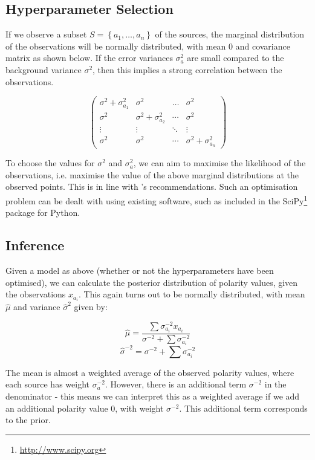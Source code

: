 \documentclass[11pt]{article}
\begin{document}
\subsection{Hyperparameter Selection} \label{sec:hyper}

If we observe a subset $S=\left\{ a_{1},\dots,a_{n}\right\} $ of
the sources, the marginal distribution of the observations will be
normally distributed, with mean $0$ and covariance matrix as shown
below. If the error variances $\sigma_{a}^{2}$ are small compared
to the background variance $\sigma^{2}$, then this implies a strong
correlation between the observations.

\[
\left(\begin{array}{cccc}
\sigma^{2}+\sigma_{a_{1}}^{2} & \sigma^{2} & \ldots & \sigma^{2}\\
\sigma^{2} & \sigma^{2}+\sigma_{a_{2}}^{2} & \cdots & \sigma^{2}\\
\vdots & \vdots & \ddots & \vdots\\
\sigma^{2} & \sigma^{2} & \cdots & \sigma^{2}+\sigma_{a_{n}}^{2}
\end{array}\right)
\]


To choose the values for $\sigma^{2}$ and $\sigma_{a}^{2}$, we can
aim to maximise the likelihood of the observations, i.e. maximise
the value of the above marginal distributions at the observed points.  This is in line with 's recommendations. Such an optimisation problem can be dealt with using existing software, such as included in the SciPy\footnote{\url{http://www.scipy.org}} package for Python.


\subsection{Inference}

Given a model as above (whether or not the hyperparameters have been
optimised), we can calculate the posterior distribution of polarity
values, given the observations $x_{a_{i}}$. This again turns out
to be normally distributed, with mean $\hat{\mu}$ and variance $\hat{\sigma}^{2}$ given by:

\[
\hat{\mu} = \frac{\sum\sigma_{a_{i}}^{-2}x_{a_{i}}}{\sigma^{-2}+\sum\sigma_{a_{i}}^{-2}}
\]
\[
\hat{\sigma}^{-2} =  \sigma^{-2}+\sum\sigma_{a_{i}}^{-2}
\]

The mean is almost a weighted average of the observed polarity values, where each source has weight $\sigma_{a}^{-2}$. However, there is an additional term $\sigma^{-2}$ in the denominator - this means we can interpret this as a weighted average if we add an additional polarity value $0$, with weight $\sigma^{-2}$. This additional term corresponds to the prior.
\end{document}
